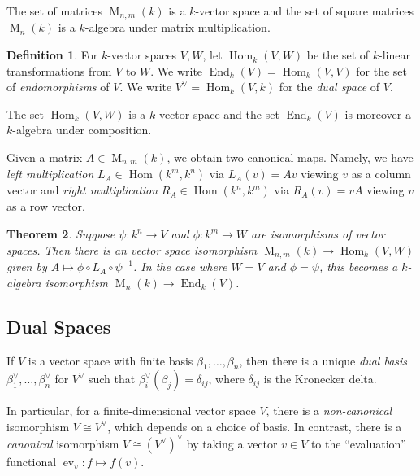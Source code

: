\documentclass[12pt]{article}
\theoremstyle{plain}
\newtheorem{theorem}{Theorem}[section]
\theoremstyle{definition}
\newtheorem{definition}[theorem]{Definition}
\theoremstyle{remark}
\numberwithin{equation}{section}
\begin{document}
The set of matrices $\operatorname{M}_{n,m}(k)$ is a $k$-vector space
and the set of square matrices $\operatorname{M}_n(k)$ is a $k$-algebra
under matrix multiplication.

\begin{definition}
For $k$-vector spaces $V,W$, let
$\operatorname{Hom}_k(V,W)$ be the set of $k$-linear
transformations from $V$ to $W$.
We write $\operatorname{End}_k(V) = \operatorname{Hom}_k(V,V)$
for the set of \emph{endomorphisms} of $V$.
We write $V^\vee = \operatorname{Hom}_k(V,k)$
for the \emph{dual space} of $V$.
\end{definition}

The set $\operatorname{Hom}_k(V,W)$ is a $k$-vector space and the set
$\operatorname{End}_k(V)$ is moreover a $k$-algebra under composition.

Given a matrix $A \in \operatorname{M}_{n,m}(k)$, we obtain
two canonical maps.
Namely, we have \emph{left multiplication}
$L_A \in \operatorname{Hom}(k^m,k^n)$ via $L_A(v)=Av$
viewing $v$ as a column vector
and \emph{right multiplication}
$R_A \in \operatorname{Hom}(k^n,k^m)$ via $R_A(v)=vA$
viewing $v$ as a row vector.

\begin{theorem}
Suppose $\psi: k^n \to V$ and $\phi : k^m \to W$ are isomorphisms of
vector spaces.
Then there is an vector space isomorphism
$\operatorname{M}_{n,m}(k) \to \operatorname{Hom}_k(V,W)$ given by
$A \mapsto \phi \circ L_A \circ \psi^{-1}$.
In the case where $W=V$ and $\phi=\psi$, this becomes a $k$-algebra
isomorphism $\operatorname{M}_n(k) \to \operatorname{End}_k(V)$.
\end{theorem}

\subsection{Dual Spaces}

If $V$ is a vector space with finite basis
$\beta_1, \ldots, \beta_n$, then there is a unique \emph{dual basis}
$\beta^\vee_1, \ldots, \beta^\vee_n$
for $V^\vee$ such that $\beta_i^\vee(\beta_j)=\delta_{ij}$,
where $\delta_{ij}$ is the Kronecker delta.

In particular, for a finite-dimensional vector space $V$,
there is a \emph{non-canonical} isomorphism $V \cong V^\vee$,
which depends on a choice of basis.
In contrast, there is a \emph{canonical} isomorphism
$V \cong (V^\vee)^\vee$ by taking a vector $v \in V$ to the
``evaluation'' functional $\operatorname{ev}_v : f \mapsto f(v)$. 
\end{document}
